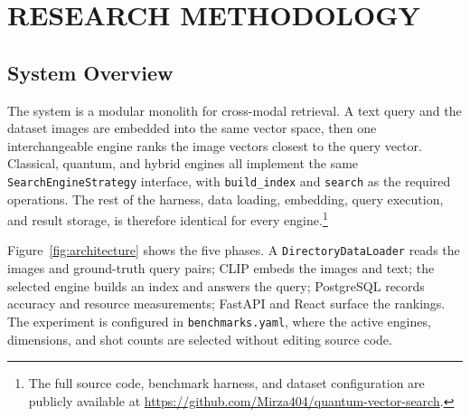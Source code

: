 \chapter{RESEARCH METHODOLOGY}
\label{ch:methodology}


\section{System Overview}
\label{sec:method:overview}


The system is a modular monolith for cross-modal retrieval. A text query and the
dataset images are embedded into the same vector space, then one interchangeable
engine ranks the image vectors closest to the query vector. Classical, quantum,
and hybrid engines all implement the same \texttt{SearchEngineStrategy}
interface, with \texttt{build\_index} and \texttt{search} as the required
operations. The rest of the harness, data loading, embedding, query execution,
and result storage, is therefore identical for every engine.\footnote{The full
source code, benchmark harness, and dataset configuration are publicly available
at \url{https://github.com/Mirza404/quantum-vector-search}.}

Figure~\ref{fig:architecture} shows the five phases. A
\texttt{DirectoryDataLoader} reads the images and ground-truth query pairs; CLIP
embeds the images and text; the selected engine builds an index and answers the
query; PostgreSQL records accuracy and resource measurements; FastAPI and React
surface the rankings. The experiment is configured in \texttt{benchmarks.yaml},
where the active engines, dimensions, and shot counts are selected without
editing source code.

